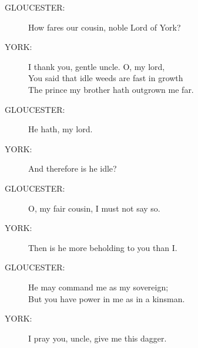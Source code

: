 \documentclass{article}
\begin{document}
\begin{description}
\item[GLOUCESTER:] 
\hspace{1pt}How fares our cousin, noble Lord of York?\\
\end{description}
\begin{description}
\item[YORK:] 
\hspace{1pt}I thank you, gentle uncle. O, my lord,\\
\hspace{1pt}You said that idle weeds are fast in growth\\
\hspace{1pt}The prince my brother hath outgrown me far.\\
\end{description}
\begin{description}
\item[GLOUCESTER:] 
\hspace{1pt}He hath, my lord.\\
\end{description}
\begin{description}
\item[YORK:] 
\hspace{1pt}And therefore is he idle?\\
\end{description}
\begin{description}
\item[GLOUCESTER:] 
\hspace{1pt}O, my fair cousin, I must not say so.\\
\end{description}
\begin{description}
\item[YORK:] 
\hspace{1pt}Then is he more beholding to you than I.\\
\end{description}
\begin{description}
\item[GLOUCESTER:] 
\hspace{1pt}He may command me as my sovereign;\\
\hspace{1pt}But you have power in me as in a kinsman.\\
\end{description}
\begin{description}
\item[YORK:] 
\hspace{1pt}I pray you, uncle, give me this dagger.\\
\end{description}
\end{document}
